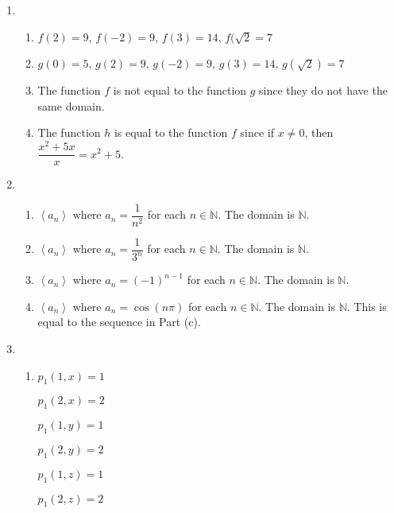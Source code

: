 \begin{enumerate}
\item \begin{enumerate}
\item $f(2) = 9$, $f(-2) = 9$, $f(3) = 14$, $f(\sqrt{2} = 7$

\item $g(0) = 5$, $g(2) = 9$, $g(-2) = 9$, $g(3) = 14$, $g(\sqrt{2}) = 7$

\item The function $f$ is not equal to the function $g$ since they do not have the same domain.

\item The function $h$ is equal to the function $f$ since if $x \ne 0$, then 
$\dfrac{x^2 + 5x}{x} = x^2 + 5$.

\end{enumerate}

\item \begin{enumerate}
\item $\left\langle {a_n } \right\rangle $  where  $a_n  = \dfrac{1}{{n^2 }}$  for each  
$n \in \mathbb{N}$.  The domain is  $\mathbb{N}$.

\item $\left\langle {a_n } \right\rangle $  where  $a_n  = \dfrac{1}{{3^n }}$  for each  
$n \in \mathbb{N}$.  The domain is  $\mathbb{N}$.

\item $\left\langle {a_n } \right\rangle $  where  $a_n  = ( -1 )^{n-1}$  for each  $n \in \mathbb{N}$.  The domain is  $\mathbb{N}$.

\item $\left\langle {a_n } \right\rangle $  where  $a_n  = \cos ( {n\pi } )$  for each  $n \in \mathbb{N}$.  The domain is  $\mathbb{N}$.  This is equal to the sequence in Part (c).
\end{enumerate}



\item \begin{enumerate}
\item
\begin{multicols}{3}
$p_1 ( 1, x ) = 1$

$p_1 ( 2, x ) = 2$

$p_1 ( 1, y ) = 1$

$p_1 ( 2, y ) = 2$

$p_1 ( 1, z ) = 1$

$p_1 ( 2, z ) = 2$
\end{multicols}


\end{enumerate}
\end{enumerate}
